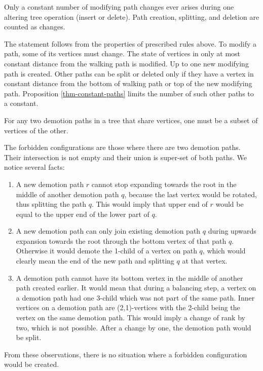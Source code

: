 \begin{prop}
Only a constant number of modifying path changes ever arises during one altering tree operation (insert or delete). Path creation, splitting, and deletion are counted as changes.
\end{prop}

\begin{myproof}
The statement follows from the properties of prescribed rules above. To modify a path, some of its vertices must change. The state of vertices in only at most constant distance from the walking path is modified. Up to one new modifying path is created. Other paths can be split or deleted only if they have a vertex in constant distance from the bottom of walking path or top of the new modifying path. Proposition \ref{thm-constant-paths} limits the number of such other paths to a constant.
\end{myproof}

\begin{prop}
For any two demotion paths in a tree that share vertices, one must be a subset of vertices of the other.
\end{prop}

\begin{myproof}
The forbidden configurations are those where there are two demotion paths. Their intersection is not empty and their union is super-set of both paths. We notice several facts: 

\begin{enumerate}
\item A new demotion path $r$ cannot stop expanding towards the root in the middle of another demotion path $q$, because the last vertex would be rotated, thus splitting the path $q$. 
This would imply that upper end of $r$ would be equal to the upper end of the lower part of $q$.

\item A new demotion path can only join existing demotion path $q$ during upwards expansion towards the root through the bottom vertex of that path $q$. 
Otherwise it would demote the 1-child of a vertex on path $q$, which would clearly mean the end of the new path and splitting $q$ at that vertex. 

\item A demotion path cannot have its bottom vertex in the middle of another path created earlier. 
It would mean that during a balancing step, a vertex on a demotion path had one 3-child which was not part of the same path. 
Inner vertices on a demotion path are (2,1)-vertices with the 2-child being the vertex on the same demotion path. 
This would imply a change of rank by two, which is not possible. After a change by one, the demotion path would be split.
\end{enumerate}
From these observations, there is no situation where a forbidden configuration would be created. 
\end{myproof}


